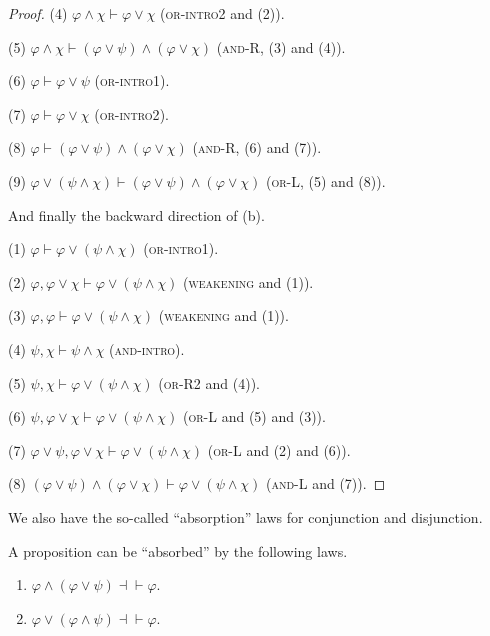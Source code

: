\begin{proof}
    (4) $\varphi\wedge\chi\vdash\varphi\vee\chi$ (\textsc{or-intro2} and (2)). 
    
    (5) $\varphi\wedge\chi\vdash(\varphi\vee\psi)\wedge(\varphi\vee\chi)$ (\textsc{and-R}, (3) and (4)). 

    (6) $\varphi\vdash\varphi\vee\psi$ (\textsc{or-intro1}). 
    
    (7) $\varphi\vdash\varphi\vee\chi$ (\textsc{or-intro2}). 
    
    (8) $\varphi\vdash(\varphi\vee\psi)\wedge(\varphi\vee\chi)$ (\textsc{and-R}, (6) and (7)). 

    (9) $\varphi\vee(\psi\wedge\chi)\vdash(\varphi\vee\psi)\wedge(\varphi\vee\chi)$ (\textsc{or-L}, (5) and (8)).

    \mbox{}

    And finally the backward direction of (b). 

    (1) $\varphi\vdash\varphi\vee(\psi\wedge\chi)$ (\textsc{or-intro1}). 
    
    (2) $\varphi,\varphi\vee\chi\vdash\varphi\vee(\psi\wedge\chi)$ (\textsc{weakening} and (1)). 
    
    (3) $\varphi,\varphi\vdash\varphi\vee(\psi\wedge\chi)$ (\textsc{weakening} and (1)). 
    
    (4) $\psi,\chi\vdash\psi\wedge\chi$ (\textsc{and-intro}). 
    
    (5) $\psi,\chi\vdash\varphi\vee(\psi\wedge\chi)$ (\textsc{or-R2} and (4)). 
    
    (6) $\psi,\varphi\vee\chi\vdash\varphi\vee(\psi\wedge\chi)$ (\textsc{or-L} and (5) and (3)). 
    
    (7) $\varphi\vee\psi,\varphi\vee\chi\vdash\varphi\vee(\psi\wedge\chi)$ (\textsc{or-L} and (2) and (6)). 
    
    (8) $(\varphi\vee\psi)\wedge(\varphi\vee\chi)\vdash\varphi\vee(\psi\wedge\chi)$ (\textsc{and-L} and (7)).
\end{proof}

We also have the so-called ``absorption'' laws for conjunction and disjunction.

\begin{theorem}
    A proposition can be ``absorbed'' by the following laws. 
    \begin{enumerate}[itemindent=0ex, itemsep=0pt, label=\upshape{(\alph*)}]
        \item $\varphi\wedge(\varphi\vee\psi)\dashv\vdash\varphi$.
        \item $\varphi\vee(\varphi\wedge\psi)\dashv\vdash\varphi$.
    \end{enumerate}
\end{theorem}

